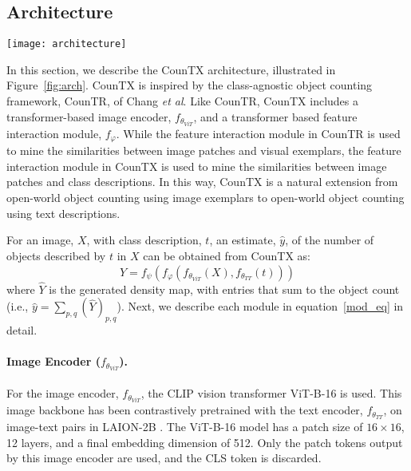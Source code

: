 \documentclass{bmvc2k}
\def\etal{\emph{et al}\bmvaOneDot}
\begin{document}
\subsection{Architecture}\label{arch}

\begin{figure*}
\centering
\texttt{[image: architecture]}
\vspace{-7mm}
   \caption{The CounTX architecture. The input image and class description are encoded by a vision transformer and a text transformer respectively. The image features are then passed to the feature interaction module to compute the query vectors, and the text feature is passed in to compute the key and value vectors. The output of the feature interaction module is reshaped to a spatial feature map that is upsampled in the decoder module to produce a density map with the same height and width as the input image and entries that sum to the object count.}
\label{fig:arch}
\vspace{-2mm}
\end{figure*}

In this section, we describe the CounTX architecture,  illustrated in Figure~\ref{fig:arch}. CounTX is inspired by the class-agnostic object counting framework, CounTR, of Chang \etal \cite{Liu2022CounTRTG}. Like CounTR, CounTX includes a transformer-based image encoder, $f_{\theta_{ViT}}$, and a transformer based feature interaction module, $f_{\varphi}$. While the feature interaction module in CounTR is used to mine the similarities between image patches and visual exemplars, the feature interaction module in CounTX is used to mine the similarities between image patches and class descriptions. In this way, CounTX is a natural extension from open-world object counting using image exemplars to open-world object counting using text descriptions.

For an image, $X$, with class description, $t$, an estimate, $\hat{y}$, of the number of objects described by $t$ in $X$ can be obtained from CounTX as:
\begin{equation}\label{mod_eq}
    \hat{Y} = f_{\psi}(f_{\varphi}(f_{\theta_{ViT}}(X), f_{\theta_{TT}}(t)))
\end{equation}
where  $\hat{Y}$ is the generated density map, with entries that sum to the object count (i.e., $\hat{y} = \sum_{p, q}(\hat{Y})_{p, q}$). Next, we describe each module in equation~\ref{mod_eq} in detail.

\paragraph{Image Encoder ($f_{\theta_{ViT}}$).}
For the image encoder, $f_{\theta_{ViT}}$, the CLIP vision transformer ViT-B-16 \cite{Radford2021LearningTV, ilharco_gabriel_2021_5143773} is used. This image backbone has been contrastively pretrained with the text encoder, $f_{\theta_{TT}}$, on image-text pairs in LAION-2B \cite{schuhmann2022laionb}. The ViT-B-16 model has a patch size of $16 \times 16$, 12 layers, and a final embedding dimension of 512. Only the patch tokens output by this image encoder are used, and the CLS token is discarded. 
\end{document}
